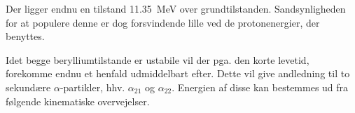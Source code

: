 Der ligger endnu en tilstand \SI{11.35}{\MeV} over grundtilstanden. Sandsynligheden for at populere
denne er dog forsvindende lille ved de protonenergier, der benyttes. 

Idet begge berylliumtilstande er ustabile vil der pga. den korte levetid, forekomme endnu et
henfald udmiddelbart efter. Dette vil give andledning til to sekundære $\alpha$-partikler, hhv.
$\alpha_{21}$ og $\alpha_{22}$. Energien af disse kan bestemmes ud fra følgende kinematiske overvejelser.
